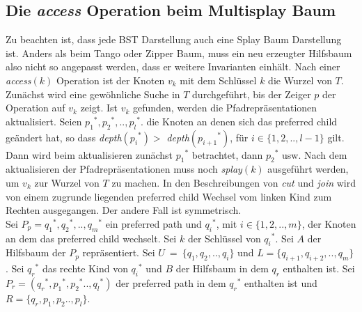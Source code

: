 \documentclass[a4paper,12pt]{article}
\begin{document}
\subsection{Die \textit{access} Operation beim Multisplay Baum}
Zu beachten ist, dass jede BST Darstellung auch eine Splay Baum Darstellung ist. Anders als beim Tango oder Zipper Baum, muss ein neu erzeugter Hilfsbaum also nicht so angepasst werden, dass er weitere Invarianten einhält.  Nach einer \textit{access}$\left(k\right)$ Operation ist der Knoten $v_k$ mit dem Schlüssel $k$ die Wurzel von $T$. Zunächst wird eine gewöhnliche Suche in $T$ durchgeführt, bis der Zeiger $p$ der Operation auf $v_k$ zeigt. Ist $v_k$ gefunden, werden die Pfadrepräsentationen aktualisiert. Seien ${p_1}^*,{p_2}^*,..,{p_l}^*.$ die Knoten an denen sich das preferred child geändert hat, so dass \textit{depth}$\left({p_i}^*\right) > $ \textit{depth}$\left({p_{i+1}}^*\right)$, für $i \in \{1, 2,..,l-1\}$ gilt. Dann wird beim aktualisieren zunächst ${p_1}^*$ betrachtet, dann ${p_2}^*$ usw. Nach dem aktualisieren der Pfadrepräsentationen muss noch \textit{splay}$\left(k\right)$ ausgeführt werden, um $v_k$ zur Wurzel von $T$ zu machen. In den Beschreibungen von \textit{cut} und \textit{join} wird von einem zugrunde liegenden preferred child Wechsel vom linken Kind zum Rechten ausgegangen. Der andere Fall ist symmetrisch.\\ 
\noindent Sei $P_p = {q_1}^*, {q_2}^*,.., {q_m}^*$ ein preferred path und ${q_i}^*$, mit $i \in \{1, 2,..,m\}$, der Knoten  an dem das preferred child wechselt. Sei $k$ der Schlüssel von ${q_i}^*$. Sei $A$ der Hilfsbaum der $P_p$ repräsentiert. Sei $U~=~\{q_1, q_2,.., q_i\}$  und $L= \{q_{i+1}, q_{i+2},..,q_m\}$.  Sei ${q_r}^*$ das rechte Kind von ${q_i}^*$ und $B$ der Hilfsbaum in dem $q_r$ enthalten ist. Sei $P_r =\left( {q_r}^*, {p_1}^*,{p_2}^*.., {q_l}^*\right)$ der preferred path in dem ${q_r}^*$ enthalten ist und  $R= \{ {q_r}, {p_1},{p_2}.., {p_l}\}$.
\end{document}
